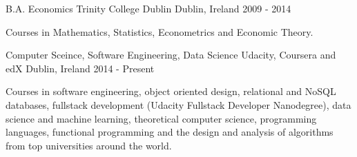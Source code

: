 

\begin{cventries}
  \cventry
    {B.A. Economics}
    {Trinity College Dublin}
    {Dublin, Ireland}
    {2009 - 2014}
    {
      \begin{cvitems}
      \item {Courses in Mathematics, Statistics, Econometrics and Economic Theory.}
      \end{cvitems}
    }
    
  \cventry
    {Computer Sceince, Software Engineering, Data Science}
    {Udacity, Coursera and edX}
    {Dublin, Ireland}
    {2014 - Present}
    {
      \begin{cvitems}
      \item {Courses in software engineering, object oriented design, relational and NoSQL databases, fullstack development (Udacity Fullstack Developer Nanodegree), data science and machine learning, theoretical computer science, programming languages, functional programming and the design and analysis of algorithms from top universities around the world.}
      \end{cvitems}
    }
    
  
\end{cventries}




